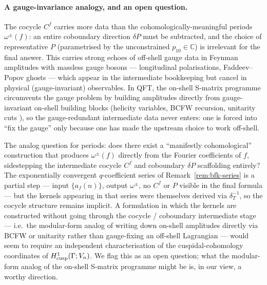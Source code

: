 \documentclass[11pt,letterpaper]{article}
\newcommand{\CC}{\mathbb{C}}
\begin{document}
\paragraph{A gauge-invariance analogy, and an open question.}
The cocycle $C^f$ carries more data than the cohomologically-meaningful
periods $\omega^\pm(f)$: an entire coboundary direction $\delta P$ must
be subtracted, and the choice of representative $P$ (parametrised by
the unconstrained $p_{10} \in \CC$) is irrelevant for the final answer.
This carries strong echoes of off-shell gauge data in Feynman amplitudes
with massless gauge bosons --- longitudinal polarisations, Faddeev--Popov
ghosts --- which appear in the intermediate bookkeeping but cancel in
physical (gauge-invariant) observables.  In QFT, the on-shell S-matrix
programme circumvents the gauge problem by building amplitudes directly
from gauge-invariant on-shell building blocks (helicity variables, BCFW
recursion, unitarity cuts \cite{McGadyHuang2013,
McGadyHuangChen2014}), so the gauge-redundant intermediate data never
enters: one is forced into ``fix the gauge'' only because one has made
the upstream choice to work off-shell.

The analog question for periods: does there exist a ``manifestly
cohomological'' construction that produces $\omega^\pm(f)$ directly from
the Fourier coefficients of $f$, sidestepping the intermediate cocycle
$C^f$ and coboundary $\delta P$ scaffolding entirely?  The exponentially
convergent $q$-coefficient series of Remark~\ref{rem:bfk-series} is a
partial step --- input $\{a_f(n)\}$, output $\omega^\pm$, no $C^f$ or
$P$ visible in the final formula --- but the kernels appearing in that
series were themselves derived via $\delta_T^{-1}$, so the cocycle
structure remains implicit.  A formulation in which the kernels are
constructed without going through the cocycle / coboundary intermediate
stage --- i.e.\ the modular-form analog of writing down on-shell
amplitudes directly via BCFW or unitarity rather than gauge-fixing an
off-shell Lagrangian --- would seem to require an independent
characterisation of the cuspidal-cohomology coordinates of
$H^1_{\rm cusp}(\Gamma; V_{n})$.  We flag this as an open question;
what the modular-form analog of the on-shell S-matrix programme might
be is, in our view, a worthy direction.
\end{document}
